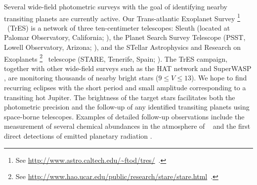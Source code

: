 Several wide-field photometric surveys with the goal of identifying
nearby transiting planets are currently active. Our
Trans-atlantic Exoplanet Survey%
\footnote{See \url{http://www.astro.caltech.edu/\~ftod/tres/}\ .}%
\ (TrES) is a network of three ten-centimeter telescopes:
Sleuth (located at Palomar Observatory, California; \citealt{ODonovan_Charbonneau_Kotredes:AIP:2004a}), the Planet Search Survey Telescope (PSST, Lowell Observatory, Arizona; \citealt{Dunham_Mandushev_Taylor:pasp:2004a}),
and the STellar Astrophysics and Research on Exoplanets%
\footnote{See \url{http://www.hao.ucar.edu/public/research/stare/stare.html}\ .}%
\ telescope (STARE, Tenerife, Spain; \citealt{Alonso_Deeg_Brown:an:2004a}). The TrES
campaign, together with other wide-field surveys such as the HAT
network \citep{Bakos_Lazar_Papp:pasp:2002a} and SuperWASP
\citep{Street_Pollaco_Fitzsimmons:ASP:2003a}, are monitoring thousands
of nearby bright stars ($9\leq V \leq 13$). We hope to find recurring
eclipses with the short period and small amplitude corresponding to a
transiting hot Jupiter. The brightness of the target stars facilitates
both the photometric precision and the follow-up of any identified
transiting planets using space-borne telescopes. Examples of detailed
follow-up observations include the measurement of several chemical
abundances in the atmosphere of \hdTZNb\
\citep{Charbonneau_Brown_Noyes:apj:2002a, Vidal-Madjar_Lecavelier-des-Etangs_Desert:nat:2003a}
and the first direct detections of emitted planetary radiation
\citep{Charbonneau_Allen_Megeath:apj:2005a, Deming_Seager_Richardson:nat:2005a}.

